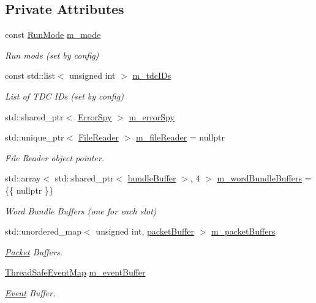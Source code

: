 \subsection*{Private Attributes}
\begin{DoxyCompactItemize}
\item 
const \hyperlink{_modes_enum_8hpp_a3dfe11cf1a3a8121f6cd7fec4bf5947e}{Run\+Mode} \hyperlink{class_processor_ac22f412163181f546d847ce23d71978d}{m\+\_\+mode}
\begin{DoxyCompactList}\small\item\em Run mode (set by config) \end{DoxyCompactList}\item 
const std\+::list$<$ unsigned int $>$ \hyperlink{class_processor_a8eaa993665bf2a2ed71f84ffc0630574}{m\+\_\+tdc\+I\+Ds}
\begin{DoxyCompactList}\small\item\em List of T\+DC I\+Ds (set by config) \end{DoxyCompactList}\item 
std\+::shared\+\_\+ptr$<$ \hyperlink{class_error_spy}{Error\+Spy} $>$ \hyperlink{class_processor_a4f79251b6b5048bb3f4b3c0e67557766}{m\+\_\+error\+Spy}
\item 
std\+::unique\+\_\+ptr$<$ \hyperlink{class_file_reader}{File\+Reader} $>$ \hyperlink{class_processor_aafe2ae55e609005c0e88226f1dd1dcb5}{m\+\_\+file\+Reader} = nullptr
\begin{DoxyCompactList}\small\item\em File Reader object pointer. \end{DoxyCompactList}\item 
std\+::array$<$ std\+::shared\+\_\+ptr$<$ \hyperlink{class_processor_a531b4c5f7c0d810fc6e9e1dd3d115725}{bundle\+Buffer} $>$, 4 $>$ \hyperlink{class_processor_a8277cf1524daaa16f0dacfddd02ffd13}{m\+\_\+word\+Bundle\+Buffers} = \{\{ nullptr \}\}
\begin{DoxyCompactList}\small\item\em Word Bundle Buffers (one for each slot) \end{DoxyCompactList}\item 
std\+::unordered\+\_\+map$<$ unsigned int, \hyperlink{class_processor_a0cfd8ed0721769db91c142a19a392e0f}{packet\+Buffer} $>$ \hyperlink{class_processor_ab75c789ec03e38e8621f000332daa285}{m\+\_\+packet\+Buffers}
\begin{DoxyCompactList}\small\item\em \hyperlink{class_packet}{Packet} Buffers. \end{DoxyCompactList}\item 
\hyperlink{class_thread_safe_event_map}{Thread\+Safe\+Event\+Map} \hyperlink{class_processor_a7cb15fbab19fceb6bc5a607629ff5040}{m\+\_\+event\+Buffer}
\begin{DoxyCompactList}\small\item\em \hyperlink{class_event}{Event} Buffer. \end{DoxyCompactList}\end{DoxyCompactItemize}


